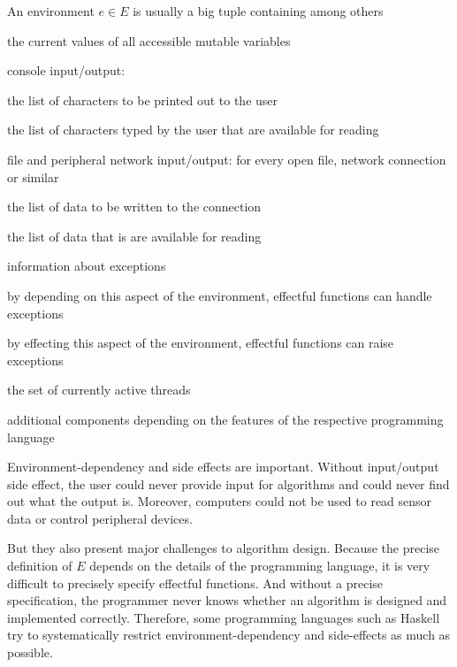 An environment $e\in E$ is usually a big tuple containing among others
\begin{compactitem}
 \item the current values of all accessible mutable variables
 \item console input/output:
   \begin{compactitem}
      \item the list of characters to be printed out to the user
      \item the list of characters typed by the user that are available for reading
   \end{compactitem}
 \item file and peripheral network input/output: for every open file, network connection or similar
   \begin{compactitem}
      \item the list of data to be written to the connection
      \item the list of data that is are available for reading
   \end{compactitem}
 \item information about exceptions
   \begin{compactitem}
      \item by depending on this aspect of the environment, effectful functions can handle exceptions
      \item by effecting this aspect of the environment, effectful functions can raise exceptions
   \end{compactitem}
 \item the set of currently active threads
 \item additional components depending on the features of the respective programming language
\end{compactitem}

Environment-dependency and side effects are important.
Without input/output side effect, the user could never provide input for algorithms and could never find out what the output is.
Moreover, computers could not be used to read sensor data or control peripheral devices.

But they also present major challenges to algorithm design.
Because the precise definition of $E$ depends on the details of the programming language, it is very difficult to precisely specify effectful functions.
And without a precise specification, the programmer never knows whether an algorithm is designed and implemented correctly.
Therefore, some programming languages such as Haskell try to systematically restrict environment-dependency and side-effects as much as possible.

